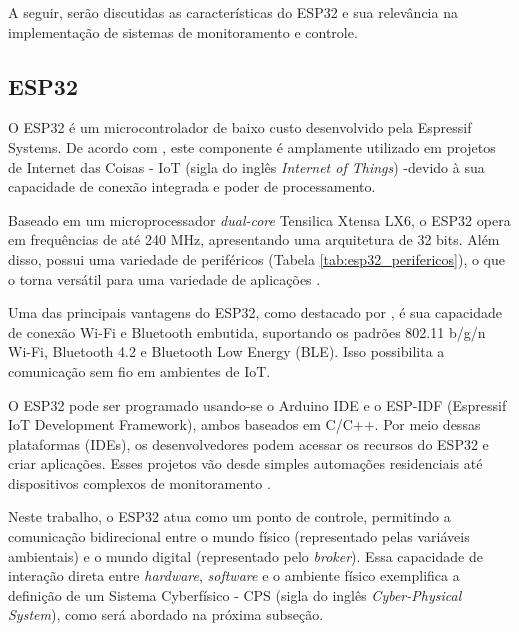 A seguir, serão discutidas as características do ESP32 e sua relevância  na implementação de sistemas de monitoramento e controle.

\subsection{ESP32}

O ESP32 é um microcontrolador de baixo custo desenvolvido pela Espressif Systems. De acordo com \textcite{ESP32_usage}, este componente é amplamente utilizado em projetos de Internet das Coisas - IoT (sigla do inglês \textit{Internet of Things}) -devido à sua capacidade de conexão integrada e poder de processamento.

Baseado em um microprocessador \textit{dual-core} Tensilica Xtensa LX6, o ESP32 opera em frequências de até 240 MHz, apresentando uma arquitetura de 32 bits. Além disso, possui uma variedade de periféricos (Tabela \ref{tab:esp32_perifericos}), o que o torna versátil para uma variedade de aplicações \parencite{EspressifESP32}.

Uma das principais vantagens do ESP32, como destacado por \textcite{ESP32_usage}, é sua capacidade de conexão Wi-Fi e Bluetooth embutida, suportando os padrões 802.11 b/g/n Wi-Fi, Bluetooth 4.2 e Bluetooth Low Energy (BLE). Isso possibilita a comunicação sem fio em ambientes de IoT.

O ESP32 pode ser programado usando-se o Arduino IDE e o ESP-IDF (Espressif IoT Development Framework), ambos baseados em C/C++. Por meio dessas plataformas (IDEs), os desenvolvedores podem acessar os recursos do ESP32 e criar aplicações. Esses projetos vão desde simples automações residenciais até dispositivos complexos de monitoramento \parencite{ferrandez2018precision, junior2022data, hsu2020creative}.

Neste trabalho, o ESP32 atua como um ponto de controle, permitindo a comunicação bidirecional entre o mundo físico (representado pelas variáveis ambientais) e o mundo digital (representado pelo \textit{broker}). Essa capacidade de interação direta entre \textit{hardware}, \textit{software} e o ambiente físico exemplifica a definição de um Sistema Cyberfísico - CPS (sigla do inglês \textit{Cyber-Physical System}), como será abordado na próxima subseção.

